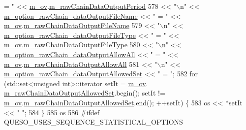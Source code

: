 \begin{DoxyCode}
{       = "} << \hyperlink{class_q_u_e_s_o_1_1_metropolis_hastings_s_g_options_a9d4792d9fc2dc5439b8ab489b0c236eb}{m\_ov}.\hyperlink{class_q_u_e_s_o_1_1_mh_options_values_ad838a3095d5158e27b9af55597822d31}{m\_rawChainDataOutputPeriod}
578      << \textcolor{stringliteral}{"\(\backslash\)n"} << \hyperlink{class_q_u_e_s_o_1_1_metropolis_hastings_s_g_options_a28d13976ef26bc450575528a37e1eeb6}{m\_option\_rawChain\_dataOutputFileName}                << \textcolor{stringliteral}{
      " = "} << \hyperlink{class_q_u_e_s_o_1_1_metropolis_hastings_s_g_options_a9d4792d9fc2dc5439b8ab489b0c236eb}{m\_ov}.\hyperlink{class_q_u_e_s_o_1_1_mh_options_values_a0ff310cdab62e1bdbff8663f8a6b1c77}{m\_rawChainDataOutputFileName}
579      << \textcolor{stringliteral}{"\(\backslash\)n"} << \hyperlink{class_q_u_e_s_o_1_1_metropolis_hastings_s_g_options_ae0bc37e9e5982b51f67e9788e4397cfa}{m\_option\_rawChain\_dataOutputFileType}                << \textcolor{stringliteral}{
      " = "} << \hyperlink{class_q_u_e_s_o_1_1_metropolis_hastings_s_g_options_a9d4792d9fc2dc5439b8ab489b0c236eb}{m\_ov}.\hyperlink{class_q_u_e_s_o_1_1_mh_options_values_ae435f8be38f9f6407a2e0f75c53b4e76}{m\_rawChainDataOutputFileType}
580      << \textcolor{stringliteral}{"\(\backslash\)n"} << \hyperlink{class_q_u_e_s_o_1_1_metropolis_hastings_s_g_options_a336b749a8e06848243cf5bfbab2e43a6}{m\_option\_rawChain\_dataOutputAllowAll}                << \textcolor{stringliteral}{
      " = "} << \hyperlink{class_q_u_e_s_o_1_1_metropolis_hastings_s_g_options_a9d4792d9fc2dc5439b8ab489b0c236eb}{m\_ov}.\hyperlink{class_q_u_e_s_o_1_1_mh_options_values_a7bd5a3926443946479ea617918d6723f}{m\_rawChainDataOutputAllowAll}
581      << \textcolor{stringliteral}{"\(\backslash\)n"} << \hyperlink{class_q_u_e_s_o_1_1_metropolis_hastings_s_g_options_a53a51bf8aa24d9dbe4a9115453bd9e2b}{m\_option\_rawChain\_dataOutputAllowedSet} << \textcolor{stringliteral}{" = "};
582   \textcolor{keywordflow}{for} (std::set<unsigned int>::iterator setIt = \hyperlink{class_q_u_e_s_o_1_1_metropolis_hastings_s_g_options_a9d4792d9fc2dc5439b8ab489b0c236eb}{m\_ov}.
      \hyperlink{class_q_u_e_s_o_1_1_mh_options_values_a99f722385d57bcb24542f3969c3764cd}{m\_rawChainDataOutputAllowedSet}.begin(); setIt != 
      \hyperlink{class_q_u_e_s_o_1_1_metropolis_hastings_s_g_options_a9d4792d9fc2dc5439b8ab489b0c236eb}{m\_ov}.\hyperlink{class_q_u_e_s_o_1_1_mh_options_values_a99f722385d57bcb24542f3969c3764cd}{m\_rawChainDataOutputAllowedSet}.end(); ++setIt) \{
583     os << *setIt << \textcolor{stringliteral}{" "};
584   \}
585   os
586 \textcolor{preprocessor}{#ifdef QUESO\_USES\_SEQUENCE\_STATISTICAL\_OPTIONS}

\end{DoxyCode}
